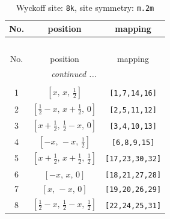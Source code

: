 \documentclass[fleqn,8pt]{jsarticle}
\begin{document}
\begin{longtable}{ccc}
\caption{Wyckoff site: {\tt 8k}, site symmetry: {\tt m.2m}}
 \\
 \hline \hline
No. & position & mapping \\ \hline \endfirsthead

\multicolumn{2}{l}{\tablename\ \thetable{}} \\
 \hline \hline
No. & position & mapping \\ \hline \endhead

 \hline \hline
\multicolumn{2}{r}{\footnotesize\it continued ...} \\ \endfoot

 \hline \hline
\multicolumn{2}{r}{} \\ \endlastfoot

1 & $\left[ x,\, x,\, \frac{1}{2} \right]$ & {\tt [1,7,14,16]} \\ \hline
2 & $\left[ \frac{1}{2} - x,\, x + \frac{1}{2},\, 0 \right]$ & {\tt [2,5,11,12]} \\ \hline
3 & $\left[ x + \frac{1}{2},\, \frac{1}{2} - x,\, 0 \right]$ & {\tt [3,4,10,13]} \\ \hline
4 & $\left[ - x,\, - x,\, \frac{1}{2} \right]$ & {\tt [6,8,9,15]} \\ \hline
5 & $\left[ x + \frac{1}{2},\, x + \frac{1}{2},\, \frac{1}{2} \right]$ & {\tt [17,23,30,32]} \\ \hline
6 & $\left[ - x,\, x,\, 0 \right]$ & {\tt [18,21,27,28]} \\ \hline
7 & $\left[ x,\, - x,\, 0 \right]$ & {\tt [19,20,26,29]} \\ \hline
8 & $\left[ \frac{1}{2} - x,\, \frac{1}{2} - x,\, \frac{1}{2} \right]$ & {\tt [22,24,25,31]} \\
\end{longtable}
\renewcommand{\arraystretch}{1.2}
\end{document}

